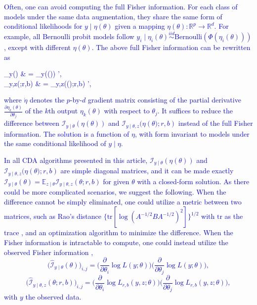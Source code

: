 \documentclass[11pt]{article}
\newcommand{\leojames}[1]{\textcolor{blue}{#1}}
\newcommand{\be}{\begin{equs}}
\newcommand{\ee}{\end{equs}}
\newcommand{\bb}[1]{\mathbb{#1}}
\newcommand{\mc}[1]{\mathcal{#1}}
\newcommand{\Bern}{\text{Bernoulli}}
\begin{document}
\leojames{
Often, one can avoid computing the full Fisher information. For  each class of models under the same data augmentation, they share the same form of conditional likelihoods for $y\mid \eta(\theta)$ given a mapping $\eta(\theta):\bb
R^p\rightarrow \bb R^d $.
 For example,  all Bernoulli probit models  follow $y_{i}\mid \eta_{i}(\theta) \stackrel{iid}{\sim}\Bern( \Phi(\eta_{i}(\theta)) )$, except with different  $\eta(\theta)$. The above full Fisher information can be rewritten as
 \be\mc I_{y\mid \theta}({\theta})  &  =  \dot \eta\mc I_{y\mid \theta}(\eta({\theta}))  \dot \eta', \\
  \mc I_{y\mid \theta,z}({\theta};r,b) & = \dot \eta\mc I_{y\mid \theta,z}(\eta({\theta)};r,b)  \dot \eta',
\ee
where $\dot \eta$ denotes the $p$-by-$d$ gradient matrix consisting of the partial
derivative $\frac{\partial
\eta_{k}(\theta)}{\partial \theta_j}$ of  the $k$th output 
$\eta_{k}(\theta)$ with respect to $\theta_j$. It suffices to reduce the difference between  $\mc I_{y\mid \theta}(\eta({\theta}))$  and $\mc I_{y\mid \theta,z}(\eta({\theta)};r,b)$ instead of the full Fisher
 information. The solution is a function of $\eta$, with form invariant to models under the same conditional likelihood of $y\mid \eta$.
 }


\leojames{
In all CDA algorithms presented in
this article,  $\mc I_{y\mid \theta}(\eta({\theta}))$  and $\mc I_{y\mid \theta,z}(\eta({\theta)};r,b)$ are simple diagonal matrices, and 
 it can be made exactly $\mc I_{y\mid \theta}({\theta})=\bb E_{z\mid \theta}\mc I_{y\mid \theta,z}({\theta};r,b)$ for given $\theta$ with a closed-form
solution. As there could be more complicated
scenarios, we suggest the following. When the difference cannot
be simply eliminated, one could utilize a metric between two matrices, such
as Rao's distance $\{\text{tr}
[\log(A^{-1/2}BA^{-1/2})^{2}]\}^{1/2}$ with $\text{tr}$ as the trace \citep{atkinson1981rao},
and an optimization algorithm to minimize the difference. When the Fisher information
is intractable to compute, one could instead utilize the observed Fisher information
\citep{efron1978assessing},    
$$\bigg(\hat{\mc I}_{y\mid \theta}({\theta}) \bigg)_{i,j}   =  \bigg( \frac{\partial}{\partial \theta_i} \log L(y;\theta) \bigg) \bigg( \frac{\partial}{\partial \theta_j} \log L(y;\theta) \bigg),$$ 
$$ \bigg(  \hat{\mc I}_{y\mid \theta,z}({\theta};r,b) \bigg)_{i,j} = \bigg( \frac{\partial}{\partial \theta_i} \log L_{r,b}(y,z;\theta) \bigg)\bigg( \frac{\partial}{\partial \theta_j} \log L_{r,b}(y,z;\theta) \bigg),$$
with $y$ the observed data.
}
\end{document}
